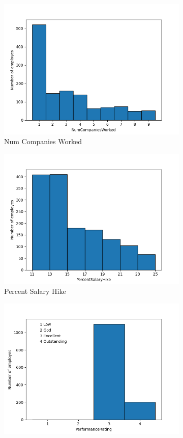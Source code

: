 \documentclass[english]{article}
\begin{document}
\begin{figure} [h]
\begin{subfigure}{.5\textwidth}
  \centering
  \includegraphics[width=.8\linewidth]{numcompanieswork.png}
  \caption{Num Companies Worked}
  \label{fig:sfig12}
\end{subfigure}
\begin{subfigure}{.5\textwidth}
  \centering
  \includegraphics[width=.8\linewidth]{PercentSalaryHike.png}
  \caption{Percent Salary Hike}
  \label{fig:sfig13}
\end{subfigure}%
\begin{subfigure}{.5\textwidth}
  \centering
  \includegraphics[width=.8\linewidth]{Performance Rating.png}

\end{subfigure}
\end{figure}
\end{document}
